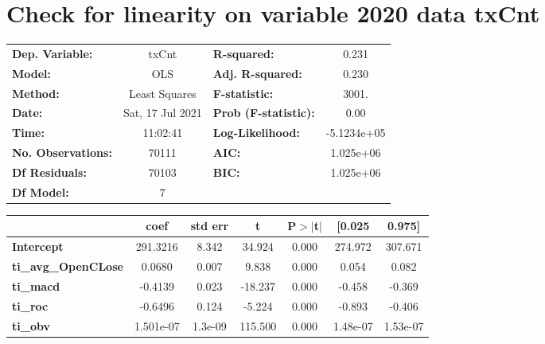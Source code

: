 \section{Check for linearity on variable 2020 data txCnt}

\begin{center}
\begin{tabular}{lclc}
\toprule
\textbf{Dep. Variable:}     &      txCnt       & \textbf{  R-squared:         } &      0.231   \\
\textbf{Model:}             &       OLS        & \textbf{  Adj. R-squared:    } &      0.230   \\
\textbf{Method:}            &  Least Squares   & \textbf{  F-statistic:       } &      3001.   \\
\textbf{Date:}              & Sat, 17 Jul 2021 & \textbf{  Prob (F-statistic):} &      0.00    \\
\textbf{Time:}              &     11:02:41     & \textbf{  Log-Likelihood:    } & -5.1234e+05  \\
\textbf{No. Observations:}  &       70111      & \textbf{  AIC:               } &  1.025e+06   \\
\textbf{Df Residuals:}      &       70103      & \textbf{  BIC:               } &  1.025e+06   \\
\textbf{Df Model:}          &           7      & \textbf{                     } &              \\
\bottomrule
\end{tabular}
\begin{tabular}{lcccccc}
                            & \textbf{coef} & \textbf{std err} & \textbf{t} & \textbf{P$> |$t$|$} & \textbf{[0.025} & \textbf{0.975]}  \\
\midrule
\textbf{Intercept}          &     291.3216  &        8.342     &    34.924  &         0.000        &      274.972    &      307.671     \\
\textbf{ti\_avg\_OpenCLose} &       0.0680  &        0.007     &     9.838  &         0.000        &        0.054    &        0.082     \\
\textbf{ti\_macd}           &      -0.4139  &        0.023     &   -18.237  &         0.000        &       -0.458    &       -0.369     \\
\textbf{ti\_roc}            &      -0.6496  &        0.124     &    -5.224  &         0.000        &       -0.893    &       -0.406     \\
\textbf{ti\_obv}            &    1.501e-07  &      1.3e-09     &   115.500  &         0.000        &     1.48e-07    &     1.53e-07     \\

\end{tabular}
\end{center}
